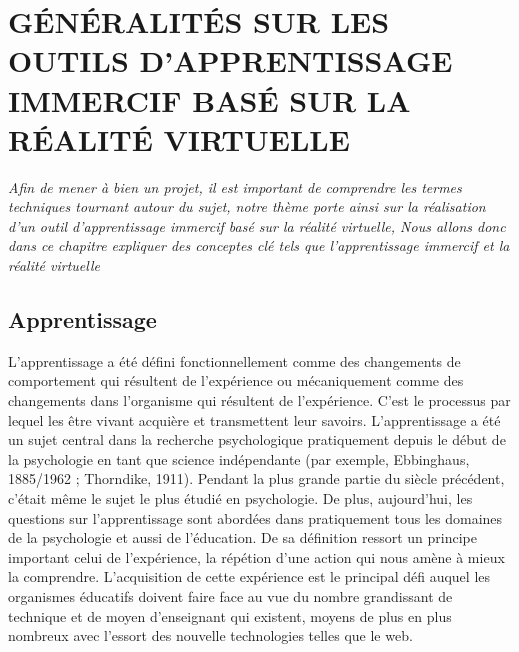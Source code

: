 


\chapter{GÉNÉRALITÉS SUR LES OUTILS D'APPRENTISSAGE IMMERCIF BASÉ SUR LA RÉALITÉ VIRTUELLE}


\textit{Afin de mener à bien un projet, il est important de comprendre les termes techniques
	tournant autour du sujet, notre thème porte ainsi sur la réalisation d'un outil d'apprentissage
	immercif basé sur la réalité virtuelle, Nous allons donc dans ce chapitre expliquer des conceptes clé tels que l'apprentissage immercif
	et la réalité virtuelle
}
\clearpage

\section{Apprentissage}

L'apprentissage a été défini fonctionnellement comme des changements de comportement qui résultent de l'expérience ou mécaniquement comme des changements dans l'organisme qui résultent de l'expérience\cite{deHouwer2013WhatIL}.
C'est le processus par lequel les être vivant acquière et transmettent leur savoirs.
L'apprentissage a été un sujet central dans la recherche psychologique pratiquement depuis le début de la psychologie
en tant que science indépendante (par exemple, Ebbinghaus, 1885/1962 ; Thorndike, 1911).
Pendant la plus grande partie du siècle précédent, c'était même le sujet le plus étudié en psychologie.
De plus, aujourd'hui, les questions sur l'apprentissage sont abordées dans pratiquement tous les domaines de la psychologie et aussi de l'éducation\cite{deHouwer2013WhatIL}.
De sa définition ressort un principe important celui de l'expérience, la répétion d'une action qui nous amène à mieux la comprendre.
L'acquisition de cette expérience est le principal défi auquel les organismes éducatifs doivent faire face au vue
du nombre grandissant de technique et de moyen d'enseignant qui existent, moyens de plus en plus nombreux avec
l'essort des nouvelle technologies telles que le web.


